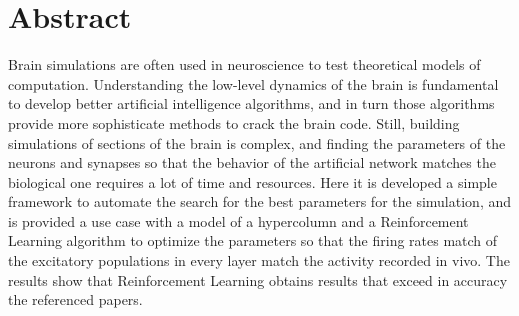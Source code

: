 \section{Abstract}

Brain simulations are often used in neuroscience to test theoretical models of computation. Understanding the low-level dynamics of the brain is fundamental to develop better artificial intelligence algorithms, and in turn those algorithms provide more sophisticate methods to crack the brain code. 
Still, building simulations of sections of the brain is complex, and finding the parameters of the neurons and synapses so that the behavior of the artificial network matches the biological one requires a lot of time and resources.
Here it is developed a simple framework to automate the search for the best parameters for the simulation, and is provided a use case with a model of a hypercolumn and a Reinforcement Learning algorithm to optimize the parameters so that the firing rates match of the excitatory populations in every layer match the activity recorded in vivo.
The results show that Reinforcement Learning obtains results that exceed in accuracy the referenced papers.

